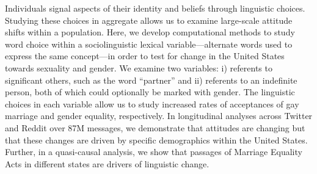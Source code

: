 Individuals signal aspects of their identity and beliefs through linguistic choices. Studying these choices in aggregate allows us to examine large-scale attitude shifts within a population. Here, we develop computational methods to study word choice within a sociolinguistic lexical variable—alternate words used to express the same concept—in order to test for change in the United States towards sexuality and gender. We examine two variables: i) referents to significant others, such as the word ``partner'' and ii) referents to an indefinite person, both of which could optionally be marked with gender. The linguistic choices in each variable allow us to study increased rates of acceptances of gay marriage and gender equality, respectively. In longitudinal analyses across Twitter and Reddit over 87M messages, we demonstrate that attitudes are changing but that these changes are driven by specific demographics within the United States. Further, in a quasi-causal analysis, we show that passages of Marriage Equality Acts in different states are drivers of linguistic change.

